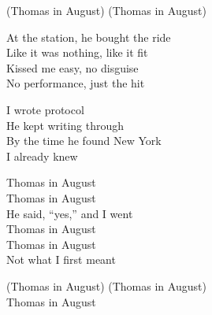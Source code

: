 \begin{lyrics}
(Thomas in August)
(Thomas in August)

At the station, he bought the ride\\
Like it was nothing, like it fit\\
Kissed me easy, no disguise\\
No performance, just the hit

I wrote protocol\\
He kept writing through\\
By the time he found New York\\
I already knew

Thomas in August\\
Thomas in August\\
He said, “yes,” and I went\\
Thomas in August\\
Thomas in August\\
Not what I first meant

(Thomas in August)
(Thomas in August)\\
Thomas in August
\end{lyrics}

